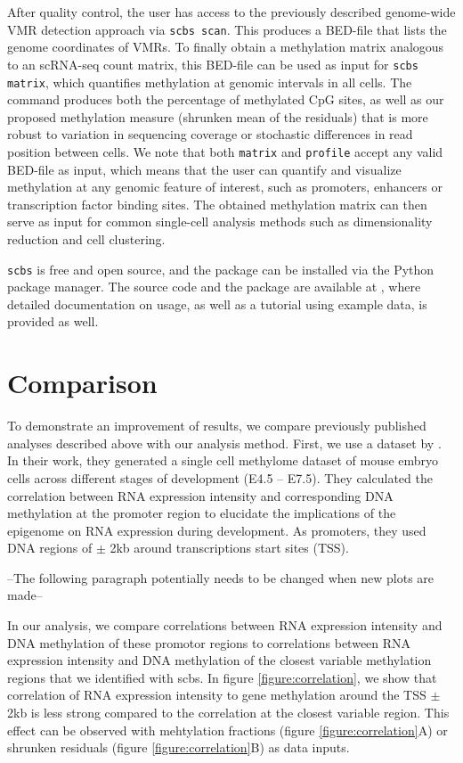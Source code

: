 \documentclass[twocolumn,10pt]{article}
\begin{document}
After quality control, the user has access to the previously described genome-wide VMR detection approach via \texttt{scbs scan}. This produces a BED-file that lists the genome coordinates of VMRs. To finally obtain a methylation matrix analogous to an scRNA-seq count matrix, this BED-file can be used as input for \texttt{scbs matrix}, which quantifies methylation at genomic intervals in all cells. The command produces both the percentage of methylated CpG sites, as well as our proposed methylation measure (shrunken mean of the residuals) that is more robust to variation in sequencing coverage or stochastic differences in read position between cells. We note that both \texttt{matrix} and \texttt{profile} accept any valid BED-file as input, which means that the user can quantify and visualize methylation at any genomic feature of interest, such as promoters, enhancers or transcription factor binding sites. The obtained methylation matrix can then serve as input for common single-cell analysis methods such as dimensionality reduction and cell clustering.

\texttt{scbs} is free and open source, and the package can be installed via the Python package manager. The source code and the package are available at \href{https://github.com/LKremer/scbs}, where detailed documentation on usage, as well as a tutorial using example data, is provided as well.


\section{Comparison}

To demonstrate an improvement of results, we compare previously published analyses described above with our analysis method.
First, we use a dataset by \citet{Argelaguet_2019}. In their work, they generated a single cell methylome dataset of mouse embryo cells across different stages of development (E4.5 – E7.5). They calculated the correlation between RNA expression intensity and corresponding DNA methylation at the promoter region to elucidate the implications of the epigenome on RNA expression during development. As promoters, they used DNA regions of $\pm$ 2kb around transcriptions start sites (TSS). 


--The following paragraph potentially needs to be changed when new plots are made--


In our analysis, we compare correlations between RNA expression intensity and DNA methylation of these promotor regions to correlations between RNA expression intensity and DNA methylation of the closest variable methylation regions that we identified with scbs. In figure \ref{figure:correlation}, we show that correlation of RNA expression intensity to gene methylation around the TSS $\pm$ 2kb is less strong compared to the correlation at the closest variable region. This effect can be observed with mehtylation fractions (figure \ref{figure:correlation}A) or shrunken residuals (figure \ref{figure:correlation}B) as data inputs.
\end{document}
